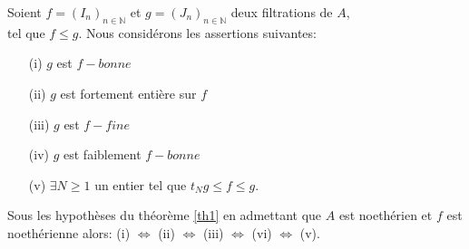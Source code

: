 \begin{maproposition}
	\label{th1}
	Soient $f=(I_n)_{n \in \mathbb{N}}$ et $g=(J_n)_{n \in \mathbb{N}}$ deux filtrations de $A$,\\ tel que $f \leqslant  g$. Nous considérons les assertions suivantes:\\
	\begin{enumerate}
		\item[(i)] $g$ est $f-bonne$
		
		\item[(ii)] $g$ est fortement entière sur $f$
		
		\item[(iii)] $g$ est $f-fine$
		
		\item[(iv)] $g$ est faiblement $f-bonne$
		
		\item[(v)]  $\exists N \geqslant 1$ un entier tel que $t_Ng \leqslant f \leqslant g$.
	\end{enumerate}
\end{maproposition}
\begin{maproposition}
	Sous les hypothèses du théorème \eqref{th1} en admettant que $A$ est noethérien
	et $f$ est noethérienne alors:
	(i) $\Longleftrightarrow $ (ii) $\Longleftrightarrow $ (iii) $\Longleftrightarrow $ (vi) $\Longleftrightarrow $ (v). 
\end{maproposition}
